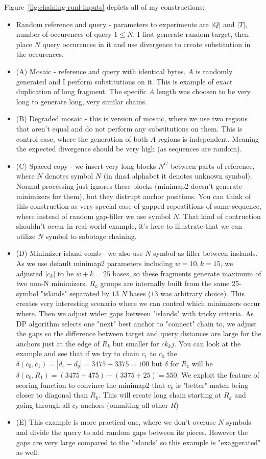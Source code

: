 Figure~\ref{fig:chaining-runl-inputs} depicts all of my constructions:
\begin{itemize}
  \item Random reference and query - parameters to experiments are $|Q|$ and $|T|$, number of occurences of query $1 \leq N$. I first generate random target, then place $N$ query occurences in it and use divergence to create substitution in the occurences.
  \item (A) Mosaic - reference and query with identical bytes. $A$ is randomly generated and I perform substitutions on it. This is example of exact duplication of long fragment.
  The specific $A$ length was choosen to be very long to generate long, very similar chains.
  \item (B) Degraded mosaic - this is version of mosaic, where we use two regions that aren't equal and do not perform any substitutions on them. This is control case, where the generation of both $A$ regions is independent. Meaning the expected
  divergence should be very high (as sequences are random).
  \item (C) Spaced copy - we insert very long blocks $N^G$ between parts of reference, where $N$ denotes symbol $N$ (in dna4 alphabet it denotes unknown symbol). Normal processing just ignores these blocks (minimap2 doesn't generate minimizers for them), but they distrupt anchor positions. You can think of this construction as very special case of gapped repeatitions of same sequence, where instead of random gap-filler we use symbol $N$. That kind of contruction shouldn't occur in real-world example, it's here to illustrate that we can utilize $N$ symbol to sabotage chaining.
  \item (D) Minimizer-island comb - we also use $N$ symbol as filler between inslands. As we use default minimap2 parameters including $w=10, k=15$, we adjusted $|c_k|$ to be $w+k=25$ bases, so these fragments generate maximum of two non-N minimizers.
  $R_k$ groups are internally built from the same 25-symbol "islands" separated by $13$ $N$ bases ($13$ was arbitrary choice).
  This creates very interesting scenario where we can control which minimizers occur where.
  Then we adjust wider gaps between "islands" with tricky criteria. As DP algorithm selects one "next" best anchor to "connect" chain to, we adjust the gaps so the difference between target and query distances are large for the anchors just at the edge of $R_k$ but smaller for $ck_kj$.
  You can look at the example and see that if we try to chain $c_1$ to $c_0$ the $\delta(c_0, c_1) = |d_r - d_q| = 3475-3375 = 100$ but $\delta$ for $R_1$ will be $\delta(c_0, R_1) = (3475+475) - (3375 + 25) = 550$. We exploit the feature of scoring function to convince the minimap2 that 
  $c_k$ is "better" match being closer to diagonal than $R_k$. This will create long chain starting at $R_k$ and going through all $c_k$ anchors (ommiting all other $R$)
  \item (E) This example is more practical one, where we don't overuse $N$ symbols and divide the query to add random gaps between its pieces. However the gaps are very large compared to the "islands" so this example is "exaggerated" as well.
\end{itemize}

